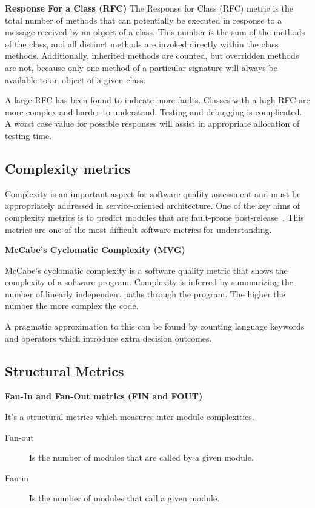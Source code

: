 \textbf{Response For a Class (RFC)} 
The Response for Class (RFC) metric is the total number of methods that can potentially be executed in response to a message received by an object of a class. This number is the sum of the methods of the class, and all distinct methods are invoked directly within the class methods. Additionally, inherited
methods are counted, but overridden methods are not, because only one method of a particular signature will always be available to an object of a given class.

A large RFC has been found to indicate more faults. Classes with a high RFC are more complex and harder to understand. Testing and debugging is complicated. A worst case value for possible responses will assist in appropriate allocation of testing time.
\subsection{Complexity metrics}
Complexity is an important aspect for software quality assessment and must be appropriately addressed in service-oriented architecture\cite{complexity}. One  of  the  key  aims  of  complexity  metrics  is  to  predict modules   that are fault-prone post-release~\cite{complexity2}. This metrics are one of the most difficult software metrics for understanding.

\textbf{McCabe's Cyclomatic Complexity (MVG)}

McCabe's cyclomatic complexity is a software quality metric that shows the complexity of a software program. Complexity is inferred by summarizing the number of linearly independent paths through the program. The higher the number the more complex the code.

A pragmatic approximation to this can be found by counting language keywords and operators which introduce extra decision outcomes.
\subsection{Structural Metrics}

\textbf{Fan-In and Fan-Out metrics (FIN and FOUT)}

It's a structural metrics which measures inter-module complexities. 
\begin{description}
	\item[Fan-out] Is the number of modules that are called by a given module.
	\item[Fan-in] Is the number of modules that call a given module.
\end{description}

